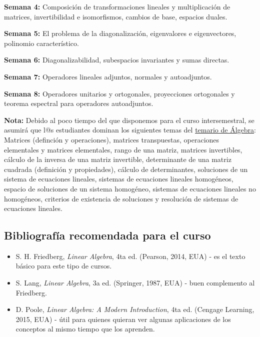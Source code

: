 \documentclass[12pt,dvipsnames]{article}
\begin{document}
\vspace{3mm}

\textbf{Semana 4:} Composición de transformaciones lineales y multiplicación de matrices, invertibilidad e isomorfismos, cambios de base, espacios duales.

\vspace{3mm}

\textbf{Semana 5:} El problema de la diagonalización, eigenvalores e eigenvectores, polinomio característico.

\vspace{3mm}

\textbf{Semana 6:} Diagonalizabilidad, subespacios invariantes y sumas directas.

\vspace{3mm}

\textbf{Semana 7:} Operadores lineales adjuntos, normales y autoadjuntos.

\vspace{3mm}

\textbf{Semana 8:} Operadores unitarios y ortogonales, proyecciones ortogonales y teorema espectral para operadores autoadjuntos.

\vspace{3mm}

\textbf{Nota:} Debido al poco tiempo del que disponemos para el curso intersemestral, se asumirá que l@s estudiantes dominan los siguientes temas del \href{https://web.fciencias.unam.mx/asignaturas/1130.pdf}{temario de Álgebra}: Matrices (definción y operaciones), matrices transpuestas, operaciones elementales y matrices elementales, rango de una matriz, matrices invertibles, cálculo de la inversa de una matriz invertible, determinante de una matriz cuadrada (definición y propiedades), cálculo de determinantes, soluciones  de  un  sistema de ecuaciones lineales, sistemas de ecuaciones lineales homogéneos, espacio  de soluciones de un sistema homogéneo, sistemas de ecuaciones lineales no homogéneos, criterios de existencia de soluciones y resolución de sistemas de ecuaciones lineales.

\subsection{Bibliografía recomendada para el curso} \label{Bibliografía}

\begin{itemize}
    \item S. H. Friedberg, \emph{Linear Algebra}, 4ta ed. (Pearson, 2014, EUA) - es el texto básico para este tipo de cursos.
    \item S. Lang, \emph{Linear Algebra}, 3a ed. (Springer, 1987, EUA) - buen complemento al Friedberg.
    \item D. Poole, \emph{Linear Algebra: A Modern Introduction}, 4ta ed. (Cengage Learning, 2015, EUA) - útil para quienes quieran ver algunas aplicaciones de los conceptos al mismo tiempo que los aprenden.
\end{itemize}{}
\end{document}
